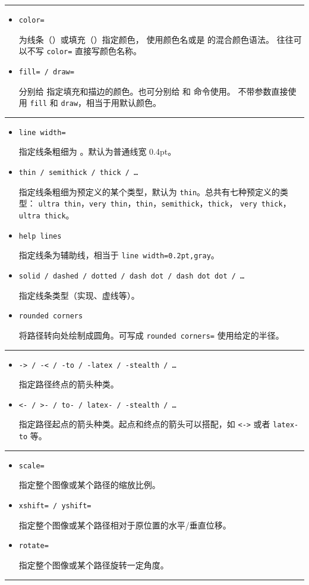 \begin{table}[htp]
\caption{\TikZ\ 常用的一些绘图参数。}\label{tbl:tikz-options}
\small
\hrule
\begin{itemize}
  \item \texttt{color=} \par
  为线条（）或填充（）指定颜色， 使用颜色名或是  的混合颜色语法。
  往往可以不写 \texttt{color=} 直接写颜色名称。
  \item \texttt{fill= / draw=} \par
  分别给  指定填充和描边的颜色。也可分别给  和  命令使用。
  不带参数直接使用 \texttt{fill} 和 \texttt{draw}，相当于用默认颜色。
\end{itemize}
\hrule
\begin{itemize}
  \item \texttt{line width=} \par
  指定线条粗细为 。默认为普通线宽 0.4pt。
  \item \texttt{thin / semithick / thick / \ldots} \par
  指定线条粗细为预定义的某个类型，默认为 \texttt{thin}。总共有七种预定义的类型：
  \texttt{ultra thin}，\texttt{very thin}，\texttt{thin}，\texttt{semithick}，\texttt{thick}，
  \texttt{very thick}，\texttt{ultra thick}。
  \item \texttt{help lines} \par
  指定线条为辅助线，相当于 \texttt{line width=0.2pt,gray}。
  \item \texttt{solid / dashed / dotted / dash dot / dash dot dot / \dots} \par
  指定线条类型（实现、虚线等）。
  \item \texttt{rounded corners} \par
  将路径转向处绘制成圆角。可写成 \texttt{rounded corners=} 使用给定的半径。
\end{itemize}
\hrule
\begin{itemize}
  \item \texttt{-> / -< / -to / -latex / -stealth / \ldots} \par
  指定路径终点的箭头种类。
  \item \texttt{<- / >- / to- / latex- / -stealth / \ldots} \par
  指定路径起点的箭头种类。起点和终点的箭头可以搭配，如 \texttt{<->} 或者 \texttt{latex-to} 等。
\end{itemize}
\hrule
\begin{itemize}
  \item \texttt{scale=} \par
  指定整个图像或某个路径的缩放比例。
  \item \texttt{xshift= / yshift=} \par
  指定整个图像或某个路径相对于原位置的水平/垂直位移。
  \item \texttt{rotate=} \par
  指定整个图像或某个路径旋转一定角度。
\end{itemize}
\hrule
\end{table}

